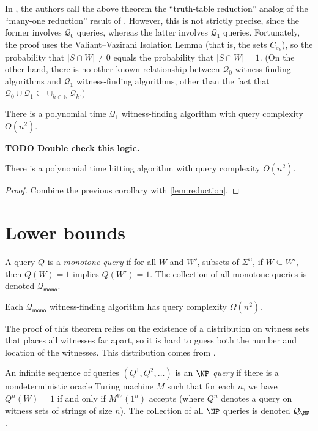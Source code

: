 \documentclass{article}
\newcommand{\todo}[1]{\textbf{TODO #1}}
\newcommand{\mc}{\mathcal}
\newcommand{\mono}{\mathsf{mono}}
\begin{document}
In \autocite{krw12}, the authors call the above theorem the ``truth-table reduction'' analog of the ``many-one reduction'' result of \autocite[Theorem~4.2]{dkvmw13}.
However, this is not strictly precise, since the former involves $\mc{Q}_0$ queries, whereas the latter involves $\mc{Q}_1$ queries.
Fortunately, the proof uses the Valiant--Vazirani Isolation Lemma (that is, the sets $C_{s_k}$), so the probability that $|S \cap W| \neq 0$ equals the probability that $|S \cap W| = 1$.
(On the other hand, there is no other known relationship between $\mc{Q}_0$ witness-finding algorithms and $\mc{Q}_1$ witness-finding algorithms, other than the fact that $\mc{Q}_0 \cup \mc{Q}_1 \subseteq \cup_{k \in \mathbb{N}} \mc{Q}_k$.)

\begin{corollary}\label{cor:q1upper}
  There is a polynomial time $\mc{Q}_1$ witness-finding algorithm with query complexity $O(n^2)$.
\end{corollary}

\todo{Double check this logic.}

\begin{corollary}
  There is a polynomial time hitting algorithm with query complexity $O(n^2)$.
\end{corollary}
\begin{proof}
  Combine the previous corollary with \autoref{lem:reduction}.
\end{proof}

\section{Lower bounds}

A query $Q$ is a \emph{monotone query} if for all $W$ and $W'$, subsets of $\Sigma^n$, if $W \subseteq W'$, then $Q(W) = 1$ implies $Q(W') = 1$.
The collection of all monotone queries is denoted $\mc{Q}_{\mono}$.

\begin{theorem}\label{thm:monotonelower}
  Each $\mc{Q}_{\mono}$ witness-finding algorithm has query complexity $\Omega(n^2)$.
\end{theorem}

The proof of this theorem relies on the existence of a distribution on witness sets that places all witnesses far apart, so it is hard to guess both the number and location of the witnesses.
This distribution comes from \autocite[Theorem~4.2]{dkvmw13}.

An infinite sequence of queries $(Q^1, Q^2, \dotsc)$ is an \emph{$\NP$ query} if there is a nondeterministic oracle Turing machine $M$ such that for each $n$, we have $Q^n(W) = 1$ if and only if $M^W(1^n)$ accepts (where $Q^n$ denotes a query on witness sets of strings of size $n$).
The collection of all $\NP$ queries is denoted $\mc{Q}_{\NP}$.
\end{document}
